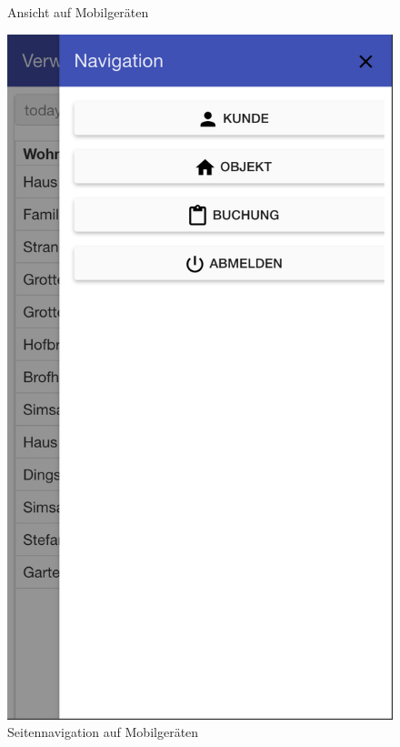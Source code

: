 \begin{figure}[H]
\begin{minipage}[t]{0.49\linewidth}
        \caption{Ansicht auf Mobilgeräten}
        \label{frontend_header_small}
    \end{minipage}%
    \hfill
    \begin{minipage}[t]{0.49\linewidth}
        \centering
        \includegraphics[width=\linewidth]{images/frontend_header_small_navigation.png}
        \caption{Seitennavigation auf Mobilgeräten}
        \label{frontend_header_small_navigation}
    \end{minipage}
\end{figure}


